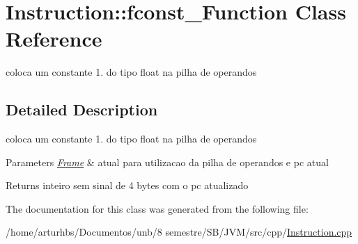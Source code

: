 \hypertarget{classInstruction_1_1fconst__1Function}{}\section{Instruction\+:\+:fconst\+\_\+Function Class Reference}
\label{classInstruction_1_1fconst__1Function}


coloca um constante 1. do tipo float na pilha de operandos  




\subsection{Detailed Description}
coloca um constante 1. do tipo float na pilha de operandos 


\begin{DoxyParams}{Parameters}
{\em \hyperlink{classFrame}{Frame}} & atual para utilizacao da pilha de operandos e pc atual \\
\hline
\end{DoxyParams}
\begin{DoxyReturn}{Returns}
inteiro sem sinal de 4 bytes com o pc atualizado 
\end{DoxyReturn}


The documentation for this class was generated from the following file\+:\begin{DoxyCompactItemize}
\item 
/home/arturhbs/\+Documentos/unb/8 semestre/\+S\+B/\+J\+V\+M/src/cpp/\hyperlink{Instruction_8cpp}{Instruction.\+cpp}\end{DoxyCompactItemize}
